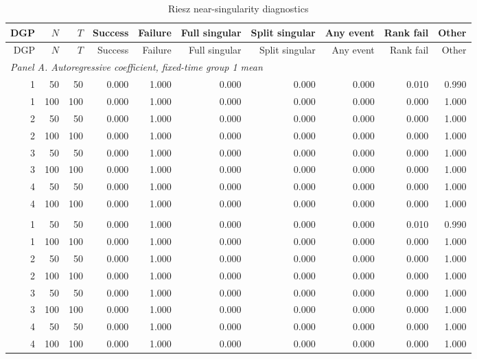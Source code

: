 \begingroup
\small
\begin{longtable}{rrrrrrrrrr}
\caption{Riesz near-singularity diagnostics}\label{tab:mc-riesz-diagnostics}\\
\toprule
DGP & $N$ & $T$ & Success & Failure & Full singular & Split singular & Any event & Rank fail & Other \\
\midrule
\endfirsthead
\toprule
DGP & $N$ & $T$ & Success & Failure & Full singular & Split singular & Any event & Rank fail & Other \\
\midrule
\endhead
\multicolumn{10}{l}{\textit{Panel A. Autoregressive coefficient, fixed-time group 1 mean}} \\
1 & 50 & 50 & 0.000 & 1.000 & 0.000 & 0.000 & 0.000 & 0.010 & 0.990 \\
1 & 100 & 100 & 0.000 & 1.000 & 0.000 & 0.000 & 0.000 & 0.000 & 1.000 \\
2 & 50 & 50 & 0.000 & 1.000 & 0.000 & 0.000 & 0.000 & 0.000 & 1.000 \\
2 & 100 & 100 & 0.000 & 1.000 & 0.000 & 0.000 & 0.000 & 0.000 & 1.000 \\
3 & 50 & 50 & 0.000 & 1.000 & 0.000 & 0.000 & 0.000 & 0.000 & 1.000 \\
3 & 100 & 100 & 0.000 & 1.000 & 0.000 & 0.000 & 0.000 & 0.000 & 1.000 \\
4 & 50 & 50 & 0.000 & 1.000 & 0.000 & 0.000 & 0.000 & 0.000 & 1.000 \\
4 & 100 & 100 & 0.000 & 1.000 & 0.000 & 0.000 & 0.000 & 0.000 & 1.000 \\
\addlinespace
\multicolumn{10}{l}{\textit{Panel B. Autoregressive coefficient, time-averaged group 1 mean---corrected}} \\
1 & 50 & 50 & 0.000 & 1.000 & 0.000 & 0.000 & 0.000 & 0.010 & 0.990 \\
1 & 100 & 100 & 0.000 & 1.000 & 0.000 & 0.000 & 0.000 & 0.000 & 1.000 \\
2 & 50 & 50 & 0.000 & 1.000 & 0.000 & 0.000 & 0.000 & 0.000 & 1.000 \\
2 & 100 & 100 & 0.000 & 1.000 & 0.000 & 0.000 & 0.000 & 0.000 & 1.000 \\
3 & 50 & 50 & 0.000 & 1.000 & 0.000 & 0.000 & 0.000 & 0.000 & 1.000 \\
3 & 100 & 100 & 0.000 & 1.000 & 0.000 & 0.000 & 0.000 & 0.000 & 1.000 \\
4 & 50 & 50 & 0.000 & 1.000 & 0.000 & 0.000 & 0.000 & 0.000 & 1.000 \\
4 & 100 & 100 & 0.000 & 1.000 & 0.000 & 0.000 & 0.000 & 0.000 & 1.000 \\

\end{longtable}
